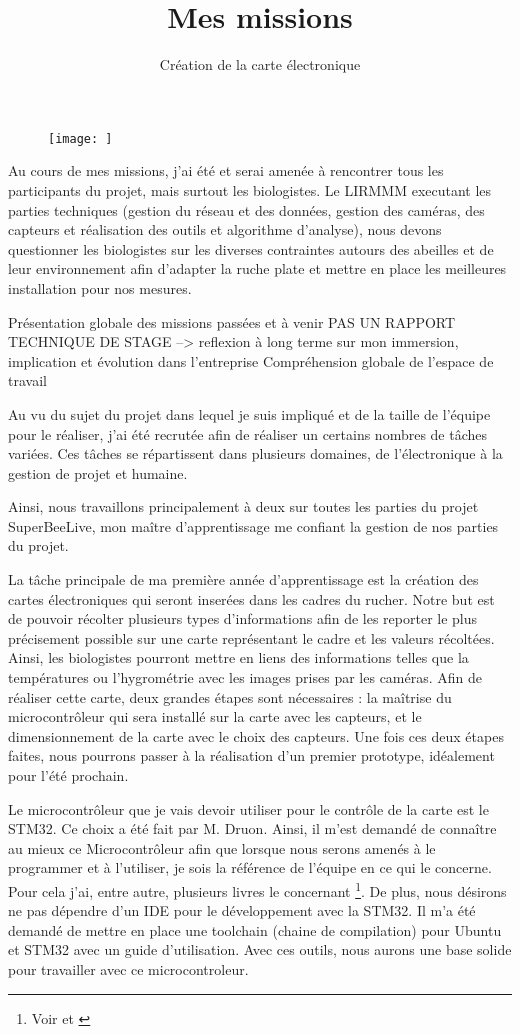 \documentclass[11pt,french,a4paper]{report}
\begin{document}
\begin{titlepage}
\begin{figure}[!h]
    \centering 
    \texttt{[image: ]}
    \label{orga_sbl}
\end{figure}

Au cours de mes missions, j'ai été et serai amenée à rencontrer tous les participants du projet, mais surtout les biologistes.
Le LIRMMM executant les parties techniques (gestion du réseau et des données, gestion des caméras, des capteurs et réalisation
des outils et algorithme d'analyse), nous devons questionner les biologistes sur les diverses contraintes autours des abeilles et 
de leur environnement afin d'adapter la ruche plate et mettre en place les meilleures installation pour nos mesures. 


\title{Mes missions}
Présentation globale des missions passées et à venir 
PAS UN RAPPORT TECHNIQUE DE STAGE --> reflexion à long terme sur mon immersion, implication et évolution dans l'entreprise
Compréhension globale de l'espace de travail 

Au vu du sujet du projet dans lequel je suis impliqué et de la taille de l'équipe pour le réaliser, j'ai été recrutée afin de réaliser 
un certains nombres de tâches variées. 
Ces tâches se répartissent dans plusieurs domaines, de l'électronique à la gestion de projet et humaine. 

Ainsi, nous travaillons principalement à deux sur toutes les parties du projet SuperBeeLive, mon maître d'apprentissage me
confiant la gestion de nos parties du projet. 

\subtitle{Création de la carte électronique}
La tâche principale de ma première année d'apprentissage est la création des cartes électroniques qui seront inserées dans 
les cadres du rucher. 
Notre but est de pouvoir récolter plusieurs types d'informations afin de les reporter le plus précisement possible sur une carte 
représentant le cadre et les valeurs récoltées. 
Ainsi, les biologistes pourront mettre en liens des informations telles que la températures ou l'hygrométrie avec les images 
prises par les caméras. 
Afin de réaliser cette carte, deux grandes étapes sont nécessaires : la maîtrise du microcontrôleur qui sera installé sur la 
carte avec les capteurs, et le dimensionnement de la carte avec le choix des capteurs. Une fois ces deux étapes faites, nous pourrons 
passer à la réalisation d'un premier prototype, idéalement pour l'été prochain. 

Le microcontrôleur que je vais devoir utiliser pour le contrôle de la carte est le STM32. Ce choix a été fait par M. Druon. 
Ainsi, il m'est demandé de connaître au mieux ce Microcontrôleur afin que lorsque nous serons amenés à le programmer et à l'utiliser, 
je sois la référence de l'équipe en ce qui le concerne. 
Pour cela j'ai, entre autre, plusieurs livres le concernant \footnote{Voir \cite{book1} et \cite{}}. 
De plus, nous désirons ne pas dépendre d'un IDE pour le développement avec la STM32. Il m'a été demandé de mettre en place 
une toolchain (chaine de compilation) pour Ubuntu et STM32 avec un guide d'utilisation. 
Avec ces outils, nous aurons une base solide pour travailler avec ce microcontroleur. 


\end{titlepage}
\end{document}

